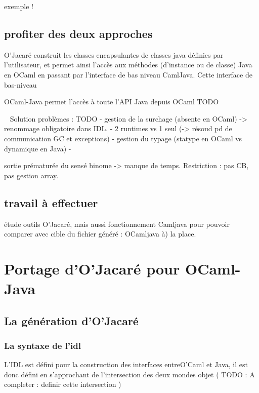 \documentclass[a4paper, 11pt, notitlepage]{article}
\begin{document}
exemple !



\subsection{profiter des deux approches}
O'Jacaré construit les classes encapsulantes de classes
java définies par l'utilisateur, et permet ainsi l'accès aux méthodes
(d'instance ou de classe) Java en OCaml en passant par l'interface de bas niveau CamlJava.
Cette interface de bas-niveau 

OCaml-Java permet l'accès à toute l'API Java depuis OCaml TODO

\ 
\newline
Solution problèmes : TODO
- gestion de la surchage (absente en OCaml) -> renommage obligatoire
dans IDL.
- 2 runtimes vs 1 seul (-> résoud pd de communication GC et exceptions)
- gestion du typage (statype en OCaml vs dynamique en Java)
-

sortie prématurée du sensé binome -> manque de temps.
Restriction : pas CB, pas gestion array.

\subsection{travail à effectuer}

étude outils O'Jacaré, mais aussi fonctionnement Camljava pour pouvoir
comparer avec cible du fichier généré : OCamljava à) la place.







\section{Portage d'O'Jacaré pour OCaml-Java}


\subsection{La génération d'O'Jacaré}
\subsubsection{La syntaxe de l'idl}
L'IDL est défini pour la construction des interfaces entreO'Caml et
Java, il est donc défini en s'approchant de l'intersection des deux
mondes objet ( TODO : A completer : definir cette intersection )
\end{document}
